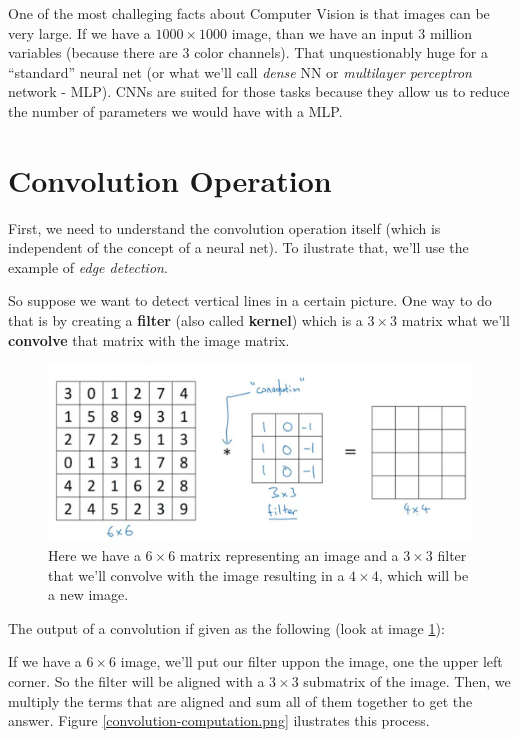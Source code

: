 \documentclass[12pt, a4paper, oneside]{book}
\begin{document}
One of the most challeging facts about Computer Vision is that images can be
very large. If we have a $1000\times 1000$ image, than we have an input $3$
million variables (because there are $3$ color channels). That unquestionably
huge for a ``standard'' neural net (or what we'll call \textit{dense} NN or
\textit{multilayer perceptron} network - MLP). CNNs are suited for those tasks
because they allow us to reduce the number of parameters we would have with a
MLP.

\section{Convolution Operation}%
\label{sec:convolution_operation}

First, we need to understand the convolution operation itself (which is
independent of the concept of a neural net). To ilustrate that, we'll use the
example of \textit{edge detection}.

So suppose we want to detect vertical lines in a certain picture. One way to do
that is by creating a \textbf{filter} (also called \textbf{kernel}) which is a
$3\times 3$ matrix what we'll \textbf{convolve} that matrix with the image
matrix.

\begin{figure}[h]
\centering
\includegraphics[scale=0.35]{Res/convolution.png}
\caption{Here we have a $6\times 6$ matrix representing an image and a $3\times
3$ filter that we'll convolve with the image resulting in a $4\times 4$, which
will be a new image.}
\label{convolution.png}
\end{figure}

The output of a convolution if given as the following (look at image
\ref{convolution.png}):

If we have a $6\times 6$ image, we'll put our filter uppon the image, one the
upper left corner. So the filter will be aligned with a $3\times 3$ submatrix of
the image. Then, we multiply the terms that are aligned and sum all of them
together to get the answer. Figure \ref{convolution-computation.png} ilustrates
this process.
\end{document}
